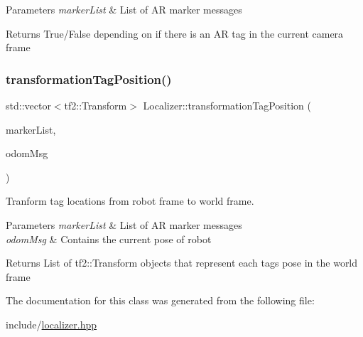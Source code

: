 \begin{DoxyParams}{Parameters}
{\em marker\+List} & List of AR marker messages \\
\hline
\end{DoxyParams}
\begin{DoxyReturn}{Returns}
True/\+False depending on if there is an AR tag in the current camera frame 
\end{DoxyReturn}
\mbox{\label{classLocalizer_a4f2090e02e67ca68cf60e0be5d54f8b6}} 
\subsubsection{\texorpdfstring{transformation\+Tag\+Position()}{transformationTagPosition()}}
{\footnotesize\ttfamily std\+::vector$<$tf2\+::\+Transform$>$ Localizer\+::transformation\+Tag\+Position (\begin{DoxyParamCaption}\item[{const std\+::vector$<$ ar\+\_\+track\+\_\+alvar\+\_\+msgs\+::\+Alvar\+Marker $>$ \&}]{marker\+List,  }\item[{const nav\+\_\+msgs\+::\+Odometry}]{odom\+Msg }\end{DoxyParamCaption})}



Tranform tag locations from robot frame to world frame. 


\begin{DoxyParams}{Parameters}
{\em marker\+List} & List of AR marker messages \\
\hline
{\em odom\+Msg} & Contains the current pose of robot \\
\hline
\end{DoxyParams}
\begin{DoxyReturn}{Returns}
List of tf2\+::\+Transform objects that represent each tag\textquotesingle{}s pose in the world frame 
\end{DoxyReturn}


The documentation for this class was generated from the following file\+:\begin{DoxyCompactItemize}
\item 
include/\hyperlink{localizer_8hpp}{localizer.\+hpp}\end{DoxyCompactItemize}
